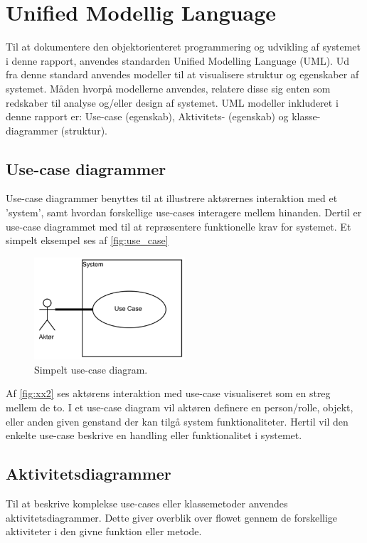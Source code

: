 \section{Unified Modellig Language}
Til at dokumentere den objektorienteret programmering og udvikling af systemet i denne rapport, anvendes standarden Unified Modelling Language (UML). Ud fra denne standard anvendes modeller til at visualisere struktur og egenskaber af systemet. Måden hvorpå modellerne anvendes, relatere disse sig enten som redskaber til analyse og/eller design af systemet. 
UML modeller inkluderet i denne rapport er:  Use-case (egenskab), Aktivitets- (egenskab) og klasse-diagrammer (struktur).


\subsection{Use-case diagrammer} 
Use-case diagrammer benyttes til at illustrere aktørernes interaktion med et 'system', samt hvordan forskellige use-cases interagere mellem hinanden. Dertil er use-case diagrammet med til at repræsentere funktionelle krav for systemet. Et simpelt eksempel ses af \autoref{fig:use_case} 

\begin{figure} [H]
\centering
\includegraphics[width=0.5\textwidth]{figures/USE_CASE2}
\caption{Simpelt use-case diagram.}
\label{fig:use_case}
\end{figure}

Af \autoref{fig:xx2} ses aktørens interaktion med use-case visualiseret som en streg mellem de to. I et use-case diagram vil aktøren definere en person/rolle, objekt, eller anden given genstand der kan tilgå system funktionaliteter. Hertil vil den enkelte use-case beskrive en handling eller funktionalitet i systemet. \cite{Fowler2004}


\subsection{Aktivitetsdiagrammer}
Til at beskrive komplekse use-cases eller klassemetoder anvendes aktivitetsdiagrammer. Dette giver overblik over flowet gennem de forskellige aktiviteter i den givne funktion eller metode. \cite{Fowler2004}    

